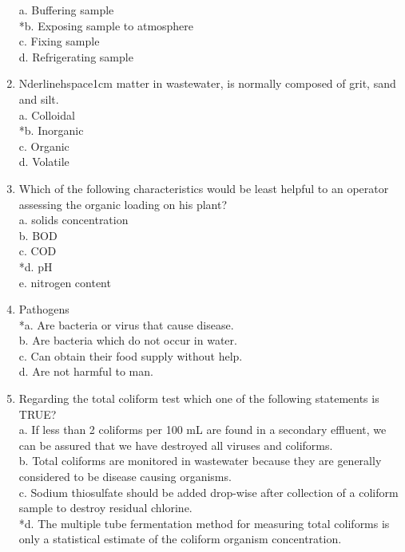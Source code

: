 \begin{enumerate}
a. Buffering sample \\
*b. Exposing sample to atmosphere \\
c. Fixing sample \\
d. Refrigerating sample 

\item {Nderline{hspace{1cm}}} matter in wastewater, is normally composed of grit, sand and silt. \\

a. Colloidal \\
*b. Inorganic \\
c. Organic \\
d. Volatile 

\item Which of the following characteristics would be least helpful to an operator assessing the organic loading on his plant? \\

a. solids concentration \\
b. BOD \\
c. COD \\
*d. pH \\
e. nitrogen content 

\item Pathogens \\

*a. Are bacteria or virus that cause disease. \\
b. Are bacteria which do not occur in water. \\
c. Can obtain their food supply without help. \\
d. Are not harmful to man. 

\item Regarding the total coliform test which one of the following statements is TRUE? \\

a. If less than 2 coliforms per 100 mL are found in a secondary effluent, we can be assured that we have destroyed all viruses and coliforms. \\
b. Total coliforms are monitored in wastewater because they are generally considered to be disease causing organisms. \\
c. Sodium thiosulfate should be added drop-wise after collection of a coliform sample to destroy residual chlorine. \\
*d. The multiple tube fermentation method for measuring total coliforms is only a statistical estimate of the coliform organism concentration. 


\end{enumerate}
